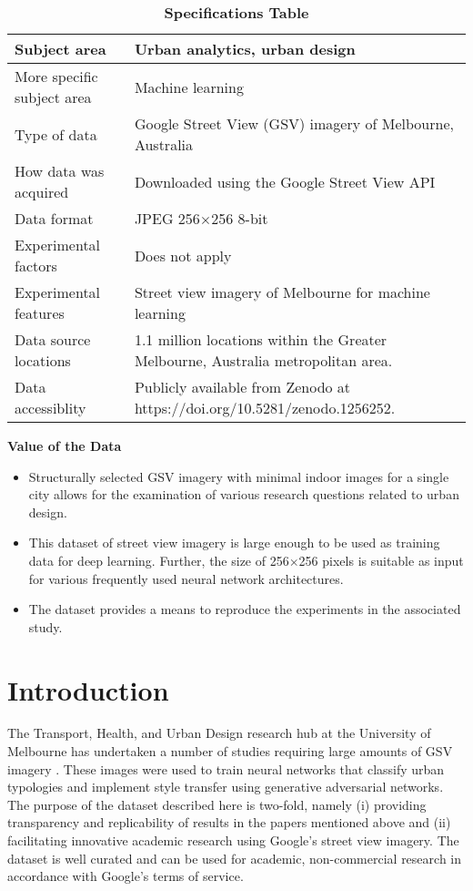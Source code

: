 \documentclass[final,3p,times,authoryear]{elsarticle}
\begin{document}

\begin{table}[!htbp]
\caption{\bf Specifications Table \label{tab:spectable}}     
\begin{tabular}{ |l | l| }
 \hline    
Subject area & Urban analytics, urban design   \\ \hline
More specific subject area & Machine learning  \\ \hline
Type of data & Google Street View (GSV) imagery of Melbourne, Australia  \\ \hline
How data was acquired & Downloaded using the Google Street View API \citep{GoogleMaps2017b}  \\ \hline
Data format & JPEG 256$\times$256 8-bit  \\ \hline
Experimental factors & Does not apply  \\ \hline
Experimental features & Street view imagery of Melbourne for machine learning  \\ \hline
Data source locations & 1.1 million locations within the Greater Melbourne, Australia metropolitan area.  \\ \hline
Data accessiblity & Publicly available from Zenodo at https://doi.org/10.5281/zenodo.1256252.    \\ \hline
\end{tabular}
\end{table}

\textbf{Value of the Data}
\begin{itemize}
\item Structurally selected GSV imagery with minimal indoor images for a single city allows for the examination of various research questions related to urban design.
\item This dataset of street view imagery is large enough to be used as training data for deep learning. Further, the size of 256$\times$256 pixels is suitable as input for various frequently used neural network architectures.
\item The dataset provides a means to reproduce the experiments in the associated study.
\end{itemize}

\section{Introduction}
\label{sec:introduction}

The Transport, Health, and Urban Design research hub at the University of Melbourne has undertaken a number of studies \citep[e.g.,][]{nice2018paris, wijnands2018urban} requiring large amounts of GSV imagery \citep{GoogleMaps2017b}. These images were used to train neural networks that classify urban typologies and implement style transfer using generative adversarial networks. The purpose of the dataset described here is two-fold, namely (i) providing transparency and replicability of results in the papers mentioned above and (ii) facilitating innovative academic research using Google's street view imagery. The dataset is well curated and can be used for academic, non-commercial research in accordance with Google's terms of service.
\end{document}
